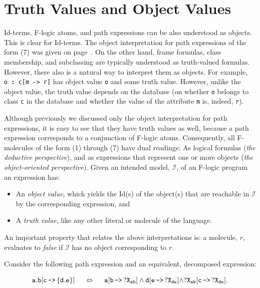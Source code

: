 \documentclass[11pt]{article}
\newcommand{\db}[1]{\ensuremath{\mathcal{#1}}}
\newcommand{\isa}{\,{\bf{:}}\,}
\newcommand{\mvd}{{\mbox{\tt \,->\,}}}  %
\newcommand{\fl}{\mbox{F-logic}\xspace}
\begin{document}
\section{Truth Values and Object Values}
\label{sec-references}


Id-terms, \fl atoms, and path expressions can be also understood as
objects. This is clear for Id-terms. The object interpretation for path
expressions of the form (7) was given on page~\pageref{eq-path-fun}.
On the other hand, frame formulas, class membership, and subclassing
are typically understood as truth-valued formulas.
However, there
also is a natural way to interpret them as objects.  For example,
{\tt o{\isa}c[m{\mvd}r]} has object value {\tt o} and some truth value.
However, unlike the object value, the truth value depends on the database
(on whether {\tt o} belongs to class {\tt c} in the database and whether
the value of the attribute {\tt m} is, indeed, {\tt r}).

Although previously we discussed only the object interpretation for path
expressions, it is easy to see that they have truth values as well, because
a path expression corresponds to a conjunction of F-logic atoms.
Consequently, all F-molecules of the form (1) through (7) have dual
readings: As logical formulas (\emph{the deductive perspective}), and as
expressions that represent one or more objects (\emph{the object-oriented
  perspective}).  Given an intended model, \db I, of an \fl program an
expression has:
\begin{itemize}
\item An \emph{object value}, which yields the Id(s) of the object(s)
  that are reachable in \db I by the corresponding expression, and 
\item A \emph{truth value}, like any other literal or molecule of the
  language. 
\end{itemize}
An important property that relates the above interpretations is: a
molecule, $r$, evaluates to \emph{false} if \db I has no object
corresponding to $r$.


Consider the following path expression and an equivalent, decomposed
expression:

\begin{equation}\label{eq-decomp}
\tt
a.b[c\mvd\{d.e\}] \quad\ \Leftrightarrow \quad\  a[b\mvd ?X_{ab}]
\land d[e\mvd ?X_{de}] \land ?X_{ab}[c\mvd ?X_{de}]. 
\end{equation}
\end{document}
